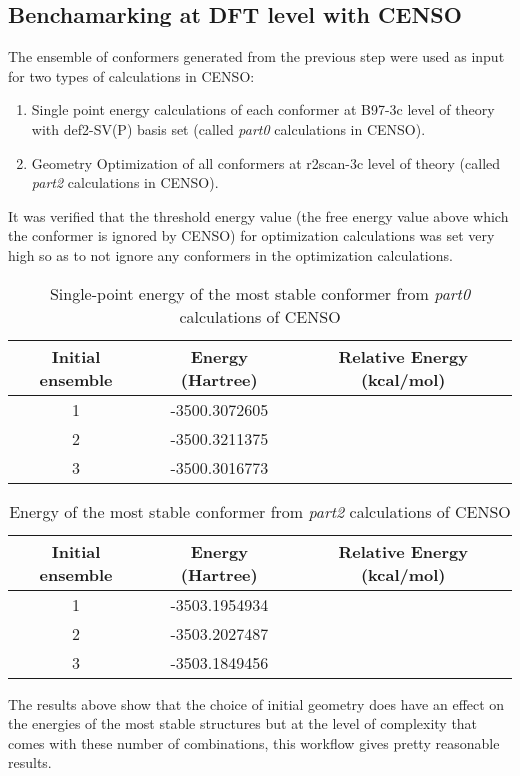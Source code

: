 \subsection{Benchamarking at DFT level with CENSO}
The ensemble of conformers generated from the previous step were used as input for two types of calculations in CENSO:
\begin{enumerate}
    \item Single point energy calculations of each conformer at B97-3c level of theory with def2-SV(P) basis set (called \textit{part0} calculations in CENSO).
    \item Geometry Optimization of all conformers at r2scan-3c level of theory (called \textit{part2} calculations in CENSO).
\end{enumerate}
It was verified that the threshold energy value (the free energy value above which the conformer is ignored by CENSO) for optimization calculations was set very high so as to not ignore any conformers in the optimization calculations. \\
\begin{table}
\centering
\begin{tabular}{|c|c|c|} \hline
\textbf{Initial ensemble} & \textbf{Energy (Hartree)} & \textbf{Relative Energy (kcal/mol)} \\ \hline
1 & -3500.3072605 & \\ \hline
2 & -3500.3211375 & \\ \hline
3 & -3500.3016773 & \\ \hline
\end{tabular}
\caption{Single-point energy of the most stable conformer from \textit{part0} calculations of CENSO}
\end{table}
\begin{table}
\centering
\begin{tabular}{|c|c|c|} \hline
\textbf{Initial ensemble} & \textbf{Energy (Hartree)} & \textbf{Relative Energy (kcal/mol)} \\ \hline
1 & -3503.1954934 & \\ \hline
2 & -3503.2027487 & \\ \hline
3 & -3503.1849456 & \\ \hline
\end{tabular}
\caption{Energy of the most stable conformer from \textit{part2} calculations of CENSO}
\end{table}
The results above show that the choice of initial geometry does have an effect on the energies of the most stable structures but at the level of complexity that comes with these number of combinations,
this workflow gives pretty reasonable results.